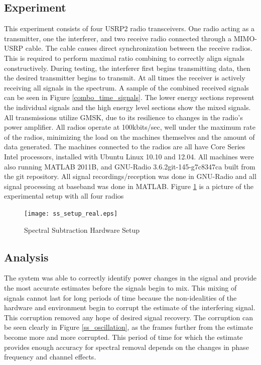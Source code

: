 \subsection{Experiment}

This experiment consists of four USRP2 radio transceivers.  One radio acting as a transmitter, one the interferer, and two receive radio connected through a MIMO-USRP cable.  The cable causes direct synchronization between the receive radios.  This is required to perform maximal ratio combining to correctly align signals constructively.  During testing, the interferer first begins transmitting data, then the desired transmitter begins to transmit.  At all times the receiver is actively receiving all signals in the spectrum.  A sample of the combined received signals can be seen in Figure \ref{combo_time_signals}.  The lower energy sections represent the individual signals and the high energy level sections show the mixed signals.\\

All transmissions utilize GMSK, due to its resilience to changes in the radio's power amplifier.  All radios operate at 100kbits/sec, well under the maximum rate of the radios, minimizing the load on the machines themselves and the amount of data generated.  The machines connected to the radios are all have Core Series Intel processors, installed with Ubuntu Linux 10.10 and 12.04.  All machines were also running MATLAB 2011B, and GNU-Radio 3.6.2git-145-g7c8347ca built from the git repository.  All signal recordings/reception was done in GNU-Radio and all signal processing at baseband was done in MATLAB.  Figure \ref{ss_setup_real} is a picture of the experimental setup with all four radios

\begin{figure}\label{ss_setup_real}
\centering
\texttt{[image: ss\_setup\_real.eps]}
\caption{Spectral Subtraction Hardware Setup}
\end{figure}

\subsection{Analysis}

The system was able to correctly identify power changes in the signal and provide the most accurate estimates before the signals begin to mix.  This mixing of signals cannot last for long periods of time because the non-idealities of the hardware and environment begin to corrupt the estimate of the interfering signal.  This corruption removed any hope of desired signal recovery.  The corruption can be seen clearly in Figure \ref{ss_oscillation}, as the frames further from the estimate become more and more corrupted.  This period of time for which the estimate provides enough accuracy for spectral removal depends on the changes in phase frequency and channel effects.\\

